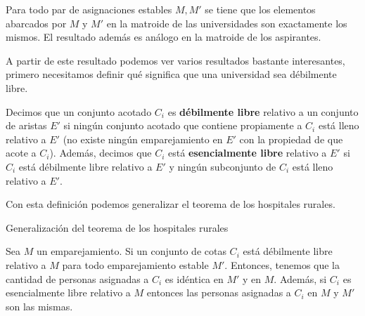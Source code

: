 \begin{teo}
\label{help}
Para todo par de asignaciones estables $M,M'$ se tiene que los elementos abarcados por $M$ y $M'$ en la matroide de las universidades son exactamente los mismos. El resultado además es análogo en la matroide de los aspirantes. 
\end{teo}

A partir de este resultado podemos ver varios resultados bastante interesantes, primero necesitamos definir qué significa que una universidad sea débilmente libre. 

\begin{dfn}
Decimos que un conjunto acotado $C_i$ es \textbf{débilmente libre} relativo a un conjunto de aristas $E'$ si ningún conjunto acotado que contiene propiamente a $C_i$ está lleno relativo a $E'$ (no existe ningún emparejamiento en $E'$ con la propiedad de que acote a $C_i$). Además, decimos que $C_i$ está \textbf{esencialmente libre} relativo a $E'$ si $C_i$ está débilmente libre relativo a $E'$ y ningún subconjunto de $C_i$ está lleno relativo a $E'$. 
\end{dfn}

Con esta definición podemos generalizar el teorema de los hospitales rurales. 

\begin{teo}{Generalización del teorema de los hospitales rurales}

Sea $M$ un emparejamiento. Si un conjunto de cotas $C_i$ está débilmente libre relativo a $M$ para todo emparejamiento estable $M'$. Entonces, tenemos que la cantidad de personas asignadas a $C_i$ es idéntica en $M'$ y en $M$. Además, si $C_i$ es esencialmente libre relativo a $M$ entonces las personas asignadas a $C_i$ en $M$ y $M'$ son las mismas. 
\end{teo}

